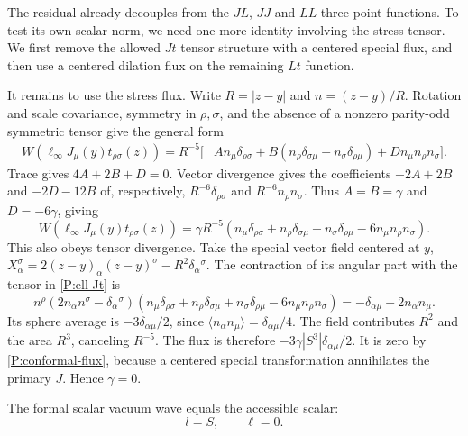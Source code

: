 The residual already decouples from the $JL$, $JJ$ and $LL$
three-point functions.  To test its own scalar norm, we need one more
identity involving the stress tensor.  We first remove the allowed
$Jt$ tensor structure with a centered special flux, and then use a
centered dilation flux on the remaining $Lt$ function.

It remains to use the stress flux.  Write $R=|z-y|$ and
$n=(z-y)/R$.  Rotation and scale covariance, symmetry in
$\rho,\sigma$, and the absence of a nonzero parity-odd symmetric
tensor give the general form
\begin{align}
 W(\ell_\infty J_\mu(y)t_{\rho\sigma}(z))
  =R^{-5}\big[&A n_\mu\delta_{\rho\sigma}
       +B(n_\rho\delta_{\sigma\mu}+n_\sigma\delta_{\rho\mu})
       +D n_\mu n_\rho n_\sigma\big].
 \label{P:ell-Jt-general}
\end{align}
Trace gives $4A+2B+D=0$.  Vector divergence gives the coefficients
$-2A+2B$ and $-2D-12B$ of, respectively,
$R^{-6}\delta_{\rho\sigma}$ and $R^{-6}n_\rho n_\sigma$.
Thus $A=B=\gamma$ and $D=-6\gamma$, giving
\begin{equation}
 W(\ell_\infty J_\mu(y)t_{\rho\sigma}(z))
 =\gamma R^{-5}
 (n_\mu\delta_{\rho\sigma}+n_\rho\delta_{\sigma\mu}
       +n_\sigma\delta_{\rho\mu}-6n_\mu n_\rho n_\sigma).
 \label{P:ell-Jt}
\end{equation}
This also obeys tensor divergence.  Take the special vector field
centered at $y$,
$X_\alpha^\sigma=2(z-y)_\alpha(z-y)^\sigma-R^2\delta_\alpha{}^\sigma$.
The contraction of its angular part with the tensor in
\eqref{P:ell-Jt} is
\begin{equation}
 n^\rho(2n_\alpha n^\sigma-\delta_\alpha{}^\sigma)
 (n_\mu\delta_{\rho\sigma}+n_\rho\delta_{\sigma\mu}
       +n_\sigma\delta_{\rho\mu}-6n_\mu n_\rho n_\sigma)
 =-\delta_{\alpha\mu}-2n_\alpha n_\mu.
 \label{P:special-angular}
\end{equation}
Its sphere average is $-3\delta_{\alpha\mu}/2$, since
$\langle n_\alpha n_\mu\rangle=\delta_{\alpha\mu}/4$.
The field contributes $R^2$ and the area $R^3$, canceling $R^{-5}$.
The flux is therefore
$-3\gamma|S^3|\delta_{\alpha\mu}/2$.  It is zero by
\eqref{P:conformal-flux}, because a centered special transformation
annihilates the primary $J$.  Hence $\gamma=0$.

\begin{theorem}
\label{P:return}
The formal scalar vacuum wave equals the accessible scalar:
\begin{equation}
 l=S,\qquad \ell=0.
 \label{P:return-equation}
\end{equation}
\end{theorem}

